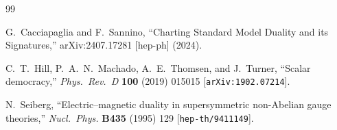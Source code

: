 \documentclass[11pt,a4paper]{article}
\begin{document}
\begin{thebibliography}{99}

  G.~Cacciapaglia and F.~Sannino,
  ``Charting Standard Model Duality and its Signatures,''
  arXiv:2407.17281 [hep-ph] (2024).

  C.~T.~Hill, P.~A.~N.~Machado, A.~E.~Thomsen, and J.~Turner,
  ``Scalar democracy,''
  \textit{Phys.\ Rev.\ D} \textbf{100} (2019) 015015
  [\texttt{arXiv:1902.07214}].

  N.~Seiberg,
  ``Electric--magnetic duality in supersymmetric non-Abelian gauge
  theories,''
  \textit{Nucl.\ Phys.} \textbf{B435} (1995) 129
  [\texttt{hep-th/9411149}].

\end{thebibliography}
\end{document}

